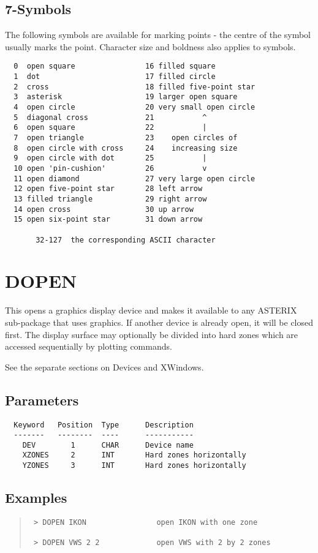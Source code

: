 \documentclass{book}
\renewcommand{\_}{{\tt\char'137}}     %
\begin{document}
\subsection{7-Symbols}
The following symbols are available for marking points -
the centre of the symbol usually marks the point.
Character size and boldness also applies to symbols.
\begin{verbatim}
  0  open square                16 filled square
  1  dot                        17 filled circle
  2  cross                      18 filled five-point star
  3  asterisk                   19 larger open square
  4  open circle                20 very small open circle
  5  diagonal cross             21           ^
  6  open square                22           |
  7  open triangle              23    open circles of
  8  open circle with cross     24    increasing size
  9  open circle with dot       25           |
  10 open 'pin-cushion'         26           v
  11 open diamond               27 very large open circle
  12 open five-point star       28 left arrow
  13 filled triangle            29 right arrow
  14 open cross                 30 up arrow
  15 open six-point star        31 down arrow

       32-127  the corresponding ASCII character
 \end{verbatim}
\section{DOPEN}
This opens a graphics display device and makes it available to
any ASTERIX sub-package that uses graphics. If another device
is already open, it will be closed first. The display surface
may optionally be divided into hard zones which are accessed
sequentially by plotting commands.

See the separate sections on Devices and XWindows.

\subsection{Parameters}
\begin{verbatim}
  Keyword   Position  Type      Description
  -------   --------  ----      -----------
    DEV        1      CHAR      Device name
    XZONES     2      INT       Hard zones horizontally
    YZONES     3      INT       Hard zones horizontally

\end{verbatim}\subsection{Examples}
\begin{quote}\begin{verbatim}
 > DOPEN IKON                open IKON with one zone

 > DOPEN VWS 2 2             open VWS with 2 by 2 zones
\end{verbatim}\end{quote}
\end{document}
